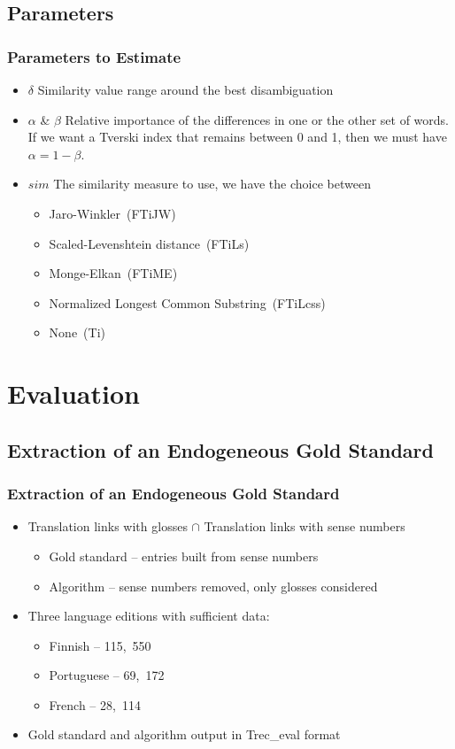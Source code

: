 \documentclass{beamer}
\begin{document}
\subsection{Parameters}
\begin{frame}
\frametitle{Parameters to Estimate}
\begin{itemize}
  \item $\delta$ Similarity value range around the best disambiguation
  \vfill
  \item $\alpha$ \& $\beta$  Relative importance of the differences in one or the other set of words. If we want a Tverski index that remains between 0 and 1, then we must have $\alpha=1-\beta$.
  \vfill
  \item $sim$ The similarity measure to use, we have the choice between
  \begin{itemize}
	  \item Jaro-Winkler~(FTiJW)
	  \item Scaled-Levenshtein distance~(FTiLs)
	  \item Monge-Elkan~(FTiME)
	  \item Normalized Longest Common Substring~(FTiLcss)
	  \item None~(Ti)
  \end{itemize}
\end{itemize}
\end{frame}

\section{Evaluation}

\subsection{Extraction of an Endogeneous Gold Standard}
\begin{frame}
	\frametitle{Extraction of an Endogeneous Gold Standard}
	\begin{itemize}
	\item Translation links with glosses $\cap$ Translation links with sense numbers
	\begin{itemize}
		\item Gold standard -- entries built from sense numbers
		\item Algorithm -- sense numbers removed, only glosses considered
	\end{itemize}
	
	\vfill
	
		\item Three language editions with sufficient data:
		\begin{itemize}
			\item Finnish -- 115,~550
			\item Portuguese -- 69,~172
			\item French -- 28,~114
		\end{itemize}
	\vfill
	\item Gold standard and algorithm output in Trec\_eval format
	\end{itemize}
\end{frame}
\end{document}
